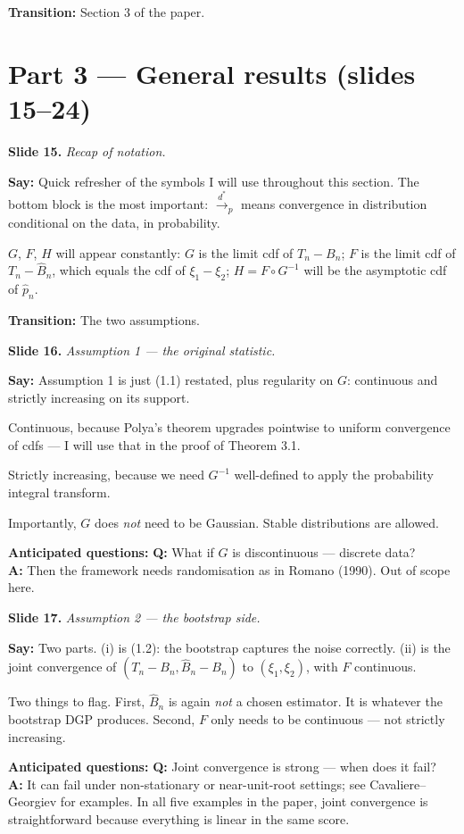 \documentclass[11pt]{article}
\theoremstyle{definition}
\newcommand{\dstarto}{\xrightarrow{d^{*}}}
\newcommand{\Tn}{T_{n}}
\newcommand{\Bn}{B_{n}}
\newcommand{\Bnh}{\hat{B}_{n}}
\newcommand{\pnh}{\hat{p}_{n}}
\newcommand{\slide}[2]{%
  \medskip
  \noindent\colorbox{soft}{\parbox{\linewidth}{\textbf{Slide #1.} \textit{#2}}}
  \medskip
}
\newcommand{\say}[1]{\textbf{Say:} #1}
\newcommand{\trans}[1]{\textbf{Transition:} #1}
\newcommand{\Q}[2]{\noindent\textcolor{warn}{\textbf{Q:}} #1\\ \textcolor{accent}{\textbf{A:}} #2\par\smallskip}
\begin{document}
\trans{Section 3 of the paper.}

\section{Part 3 --- General results (slides 15--24)}

\slide{15}{Recap of notation.}
\say{Quick refresher of the symbols I will use throughout this section. The
bottom block is the most important: $\dstarto_p$ means convergence in
distribution conditional on the data, in probability.

$G$, $F$, $H$ will appear constantly: $G$ is the limit cdf of $\Tn-\Bn$;
$F$ is the limit cdf of $\Tn-\Bnh$, which equals the cdf of $\xi_1-\xi_2$;
$H=F\circ G^{-1}$ will be the asymptotic cdf of $\pnh$.}

\trans{The two assumptions.}

\slide{16}{Assumption 1 --- the original statistic.}
\say{Assumption 1 is just (1.1) restated, plus regularity on $G$:
continuous and strictly increasing on its support.

Continuous, because Polya's theorem upgrades pointwise to uniform convergence
of cdfs --- I will use that in the proof of Theorem 3.1.

Strictly increasing, because we need $G^{-1}$ well-defined to apply the
probability integral transform.

Importantly, $G$ does \emph{not} need to be Gaussian. Stable distributions are
allowed.}

\textbf{Anticipated questions:}
\Q{What if $G$ is discontinuous --- discrete data?}
{Then the framework needs randomisation as in Romano (1990). Out of scope here.}

\slide{17}{Assumption 2 --- the bootstrap side.}
\say{Two parts. (i) is (1.2): the bootstrap captures the noise correctly. (ii)
is the joint convergence of $(\Tn-\Bn,\Bnh-\Bn)$ to $(\xi_1,\xi_2)$, with
$F$ continuous.

Two things to flag. First, $\Bnh$ is again \emph{not} a chosen estimator. It
is whatever the bootstrap DGP produces. Second, $F$ only needs to be
continuous --- not strictly increasing.}

\textbf{Anticipated questions:}
\Q{Joint convergence is strong --- when does it fail?}
{It can fail under non-stationary or near-unit-root settings; see Cavaliere--
Georgiev for examples. In all five examples in the paper, joint convergence
is straightforward because everything is linear in the same score.}
\end{document}
